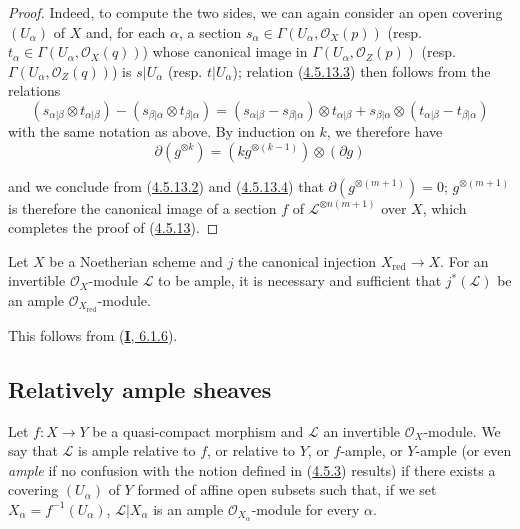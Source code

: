 \begin{proof}
Indeed, to compute the two sides, we can again consider an open
covering $(U_\alpha)$ of $X$ and, for each $\alpha$, a section
$s_\alpha\in\Gamma(U_\alpha,\mathcal{O}_X(p))$ (resp.
$t_\alpha\in\Gamma(U_\alpha,\mathcal{O}_X(q))$) whose canonical image in
$\Gamma(U_\alpha,\mathcal{O}_Z(p))$ (resp.
$\Gamma(U_\alpha,\mathcal{O}_Z(q))$) is $s|U_\alpha$ (resp.
$t|U_\alpha$); relation
(\hyperref[II.4.5.13.3]{4.5.13.3}) then follows from the relations
\[
  (s_{\alpha|\beta}\otimes t_{\alpha|\beta})
  -(s_{\beta|\alpha}\otimes t_{\beta|\alpha})
  =(s_{\alpha|\beta}-s_{\beta|\alpha})\otimes t_{\alpha|\beta}
  +s_{\beta|\alpha}\otimes(t_{\alpha|\beta}-t_{\beta|\alpha})
\]
with the same notation as above. By induction on $k$, we therefore have
\begin{equation}
\label{II.4.5.13.4}
  \partial(g^{\otimes k})=(kg^{\otimes(k-1)})\otimes(\partial g)
\tag{4.5.13.4}
\end{equation}


and we conclude from (\hyperref[II.4.5.13.2]{4.5.13.2}) and
(\hyperref[II.4.5.13.4]{4.5.13.4}) that
$\partial(g^{\otimes(m+1)})=0$; $g^{\otimes(m+1)}$ is therefore the
canonical image of a section $f$ of $\mathcal{L}^{\otimes n(m+1)}$ over
$X$, which completes the proof of (\hyperref[II.4.5.13]{4.5.13}).
\end{proof}

\begin{corollary}[4.5.14]
\label{II.4.5.14}
Let $X$ be a Noetherian scheme and $j$ the canonical injection
$X_{\mathrm{red}}\to X$. For an invertible $\mathcal{O}_X$-module
$\mathcal{L}$ to be ample, it is necessary and sufficient that $j^*(\mathcal{L})$ be
an ample $\mathcal{O}_{X_{\mathrm{red}}}$-module.
\end{corollary}

This follows from (\hyperref[I.6.1.6]{\textbf{I}, 6.1.6}).


\subsection{Relatively ample sheaves}
\label{II.4.6}

\begin{definition}[4.6.1]
\label{II.4.6.1}
Let $f:X\to Y$ be a quasi-compact morphism and $\mathcal{L}$ an invertible
$\mathcal{O}_X$-module. We say that $\mathcal{L}$ is ample
relative to $f$, or relative to $Y$, or $f$-ample, or $Y$-ample \textup{(or
even \emph{ample} if no confusion with the notion defined in
(\hyperref[II.4.5.3]{4.5.3}) results)} if there exists a covering $(U_\alpha)$
of $Y$ formed of affine open subsets such that, if we set
$X_\alpha=f^{-1}(U_\alpha)$, $\mathcal{L}|X_\alpha$ is an ample
$\mathcal{O}_{X_\alpha}$-module for every $\alpha$.
\end{definition}

